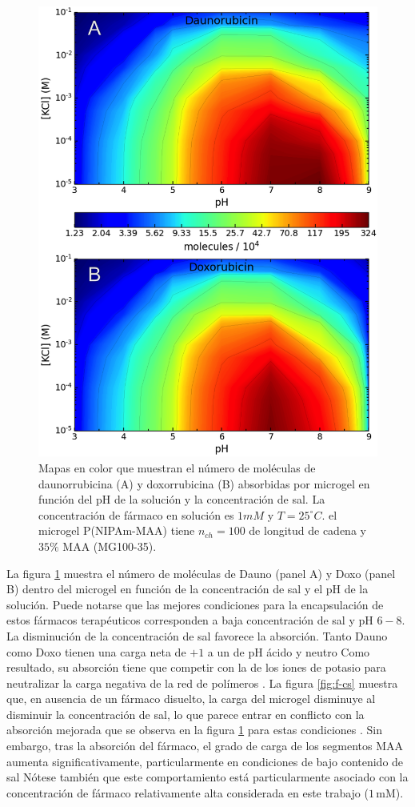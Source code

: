\begin{figure}[!tb]
	\centering
	\includegraphics[width=0.55\linewidth]{Figures/graph-gel/drug_ads.png}
	\caption{Mapas en color que muestran el n\'umero de mol\'eculas de daunorrubicina (A) y doxorrubicina (B) absorbidas por microgel en funci\'on del pH de la soluci\'on y la concentraci\'on de sal.
		La concentraci\'on de f\'armaco en soluci\'on es $1mM$ y $T=25 ^\circ C$.
		el microgel P(NIPAm-MAA) tiene $n_{ch}=100$ de longitud de cadena y $35\%$ MAA (MG100-35).}
	\label{fig:drug_ads}
\end{figure}



La figura \ref{fig:drug_ads} muestra el n\'umero de mol\'eculas de Dauno (panel A) y Doxo (panel B) dentro del microgel en funci\'on de la concentraci\'on de sal y el pH de la soluci\'on.
Puede notarse que las mejores condiciones para la encapsulaci\'on de estos f\'armacos terap\'euticos corresponden a baja concentraci\'on de sal y pH $6-8$.
La disminución de la concentraci\'on de sal favorece la absorci\'on.
Tanto Dauno como Doxo tienen una carga neta de $+1$ a un  de pH \'acido y neutro %
Como resultado, su absorci\'on tiene que competir con la de los iones de potasio para neutralizar la carga negativa de la red de pol\'imeros \cite{PerezChavez2020}.
La figura \ref{fig:f-cs} muestra que, en ausencia de un f\'armaco disuelto, la carga del microgel disminuye al disminuir la concentraci\'on de sal, lo que parece entrar en conflicto con la absorci\'on mejorada que se observa en la figura \ref{fig:drug_ads} para estas condiciones .
Sin embargo, tras la absorci\'on del f\'armaco, el grado de carga de los segmentos MAA aumenta significativamente, particularmente en condiciones de bajo contenido de sal %
N\'otese tambi\'en que este comportamiento est\'a particularmente asociado con la concentraci\'on de f\'armaco relativamente alta considerada en este trabajo ($1\,$mM).

